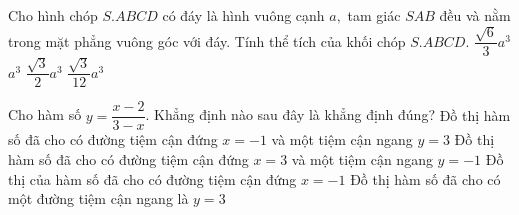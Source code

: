 \begin{ex}%
	Cho hình chóp $ S.ABCD $ có đáy là hình vuông cạnh $ a, $ tam giác $ SAB $ đều và nằm trong mặt phẳng vuông góc với đáy. Tính thể tích của khối chóp $ S.ABCD. $
	\choice
	{\True $ \dfrac{\sqrt{6}}{3}a^3 $}
	{$ a^3$}
	{$ \dfrac{\sqrt{3}}{2}a^3 $}
	{ $ \dfrac{\sqrt{3}}{12}a^3 $}
\end{ex}
\begin{ex}%
Cho hàm số $ y = \dfrac{x - 2}{3 - x} $. Khẳng định nào sau đây là khẳng định đúng?	
	\choice
	{Đồ thị hàm số đã cho có đường tiệm cận đứng $ x = -1 $ và một tiệm cận ngang $ y = 3$}
	{\True Đồ thị hàm số đã cho có đường tiệm cận đứng $ x = 3 $ và một tiệm cận ngang $ y = -1$}
	{ Đồ thị của hàm số đã cho có đường tiệm cận đứng $ x = -1 $}
	{Đồ thị hàm số đã cho có một đường tiệm cận ngang là $ y=3$ }
\end{ex}
